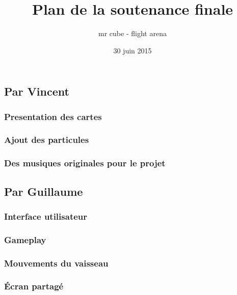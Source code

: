 \documentclass{article}
\title{Plan de la soutenance finale}
\author{mr cube - flight arena}
\date{30 juin 2015}
\begin{document}
\maketitle

\section{}

\section{}

\section{}

\subsection{Par Vincent}
\subsubsection{Presentation des cartes}
\subsubsection{Ajout des particules}
\subsubsection{Des musiques originales pour le projet}

\subsection{Par Guillaume}
\subsubsection{Interface utilisateur}
\subsubsection{Gameplay}
\subsubsection{Mouvements du vaisseau}
\subsubsection{Écran partagé}
\end{document}
